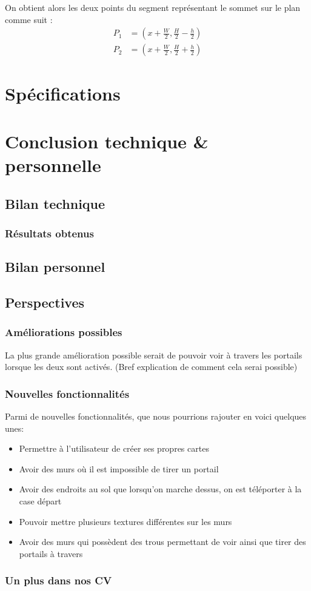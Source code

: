 \documentclass[11pt]{article}
\begin{document}
On obtient alors les deux points du segment représentant le sommet sur le plan comme suit :
\begin{align*}
    P_1 &= (x + \frac{W}{2}, \frac{H}{2} - \frac{h}{2}) \\
	P_2 &= (x + \frac{W}{2}, \frac{H}{2} + \frac{h}{2})
\end{align*}

\section{Spécifications}


\section{Conclusion technique \& personnelle}
\subsection{Bilan technique}
\subsubsection{Résultats obtenus}
\subsection{Bilan personnel}
\subsection{Perspectives}
\subsubsection{Améliorations possibles}

La plus grande amélioration possible serait de pouvoir voir à travers les portails
lorsque les deux sont activés. (Bref explication de comment cela serai possible)

\subsubsection{Nouvelles fonctionnalités}

Parmi de nouvelles fonctionnalités, que nous pourrions rajouter en voici quelques unes:
\begin{itemize}
	\item Permettre à l'utilisateur de créer ses propres cartes
	\item Avoir des murs où il est impossible de tirer un portail
	\item Avoir des endroits au sol que lorsqu'on marche dessus, on est téléporter à la case départ
	\item Pouvoir mettre plusieurs textures différentes sur les murs
	\item Avoir des murs qui possèdent des trous permettant de voir ainsi que tirer des portails à travers
\end{itemize}

\subsubsection{Un plus dans nos CV}



\end{document}
